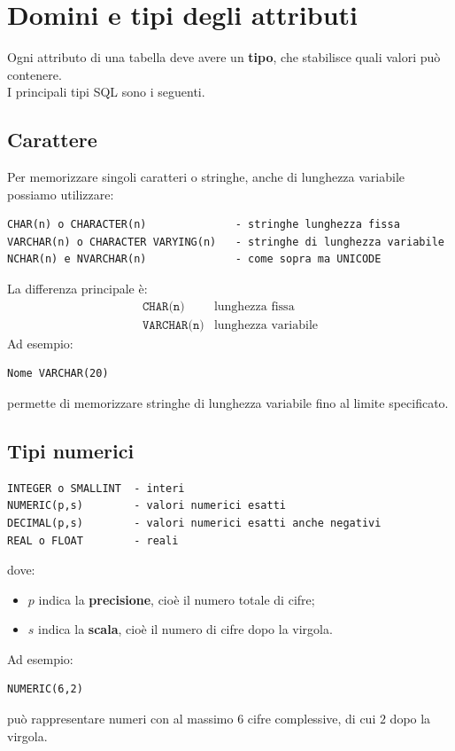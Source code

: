 
\section{Domini e tipi degli attributi}
Ogni attributo di una tabella deve avere un \textbf{tipo},
che stabilisce quali valori può contenere.\\
I principali tipi SQL sono i seguenti.

\subsection{Carattere}
Per memorizzare singoli caratteri o stringhe, anche di lunghezza variabile possiamo utilizzare:
\begin{verbatim}
CHAR(n) o CHARACTER(n)              - stringhe lunghezza fissa
VARCHAR(n) o CHARACTER VARYING(n)   - stringhe di lunghezza variabile
NCHAR(n) e NVARCHAR(n)              - come sopra ma UNICODE
\end{verbatim}
\noindent La differenza principale è:
\[
\boxed{
\begin{array}{c|c}
\texttt{CHAR(n)} & \text{lunghezza fissa} \\
\texttt{VARCHAR(n)} & \text{lunghezza variabile}
\end{array}
}
\]
Ad esempio:
\begin{verbatim}
Nome VARCHAR(20)
\end{verbatim}
\noindent permette di memorizzare stringhe di lunghezza variabile fino al
limite specificato.

\subsection{Tipi numerici}
\begin{verbatim}
INTEGER o SMALLINT  - interi
NUMERIC(p,s)        - valori numerici esatti
DECIMAL(p,s)        - valori numerici esatti anche negativi
REAL o FLOAT        - reali
\end{verbatim}
\noindent dove:
\begin{itemize}
    \item $p$ indica la \textbf{precisione}, cioè il numero totale di cifre;
    \item $s$ indica la \textbf{scala}, cioè il numero di cifre dopo
          la virgola.
\end{itemize}
\noindent Ad esempio:
\begin{verbatim}
NUMERIC(6,2)
\end{verbatim}
\noindent può rappresentare numeri con al massimo $6$ cifre complessive,
di cui $2$ dopo la virgola.

